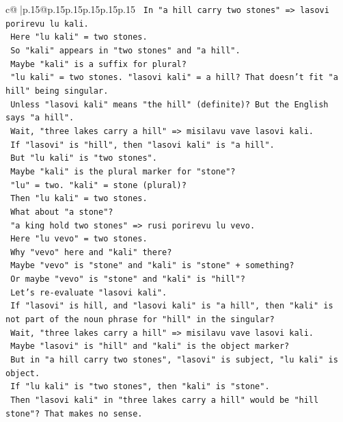 \documentclass{article}
\begin{document}
{\begin{supertabular}{c@{$\;$}|p{.15\linewidth}@{}p{.15\linewidth}p{.15\linewidth}p{.15\linewidth}p{.15\linewidth}p{.15\linewidth}}
{{{\texttt{   In "a hill carry two stones" => lasovi porirevu lu kali.} \\
\texttt{   Here "lu kali" = two stones.} \\
\texttt{   So "kali" appears in "two stones" and "a hill".} \\
\texttt{   Maybe "kali" is a suffix for plural?} \\
\texttt{   "lu kali" = two stones. "lasovi kali" = a hill? That doesn't fit "a hill" being singular.} \\
\texttt{   Unless "lasovi kali" means "the hill" (definite)? But the English says "a hill".} \\
\texttt{   Wait, "three lakes carry a hill" => misilavu vave lasovi kali.} \\
\texttt{   If "lasovi" is "hill", then "lasovi kali" is "a hill".} \\
\texttt{   But "lu kali" is "two stones".} \\
\texttt{   Maybe "kali" is the plural marker for "stone"?} \\
\texttt{   "lu" = two. "kali" = stone (plural)?} \\
\texttt{   Then "lu kali" = two stones.} \\
\texttt{   What about "a stone"?} \\
\texttt{   "a king hold two stones" => rusi porirevu lu vevo.} \\
\texttt{   Here "lu vevo" = two stones.} \\
\texttt{   Why "vevo" here and "kali" there?} \\
\texttt{   Maybe "vevo" is "stone" and "kali" is "stone" + something?} \\
\texttt{   Or maybe "vevo" is "stone" and "kali" is "hill"?} \\
\texttt{   Let's re{-}evaluate "lasovi kali".} \\
\texttt{   If "lasovi" is hill, and "lasovi kali" is "a hill", then "kali" is not part of the noun phrase for "hill" in the singular?} \\
\texttt{   Wait, "three lakes carry a hill" => misilavu vave lasovi kali.} \\
\texttt{   Maybe "lasovi" is "hill" and "kali" is the object marker?} \\
\texttt{   But in "a hill carry two stones", "lasovi" is subject, "lu kali" is object.} \\
\texttt{   If "lu kali" is "two stones", then "kali" is "stone".} \\
\texttt{   Then "lasovi kali" in "three lakes carry a hill" would be "hill stone"? That makes no sense.} \\
}}}
\end{supertabular}}
\end{document}
